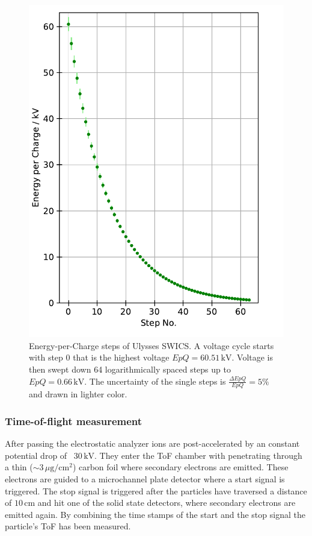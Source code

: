 \begin{figure}[h]
		\centering
		\includegraphics[scale = 0.7]{Figures/epq_err.pdf}
		\caption{Energy-per-Charge steps of Ulysses SWICS. A voltage cycle starts with step 0 that is the highest voltage $EpQ = 60.51\, \mathrm{kV}$. Voltage is then swept down 64 logarithmically spaced steps up to $EpQ = 0.66\, \mathrm{kV}$. The uncertainty of the single steps is $\frac{\Delta EpQ}{EpQ} = 5\%$ and drawn in lighter color.
		} \label{fig:epq}
\end{figure}
  
\subsubsection{Time-of-flight measurement}
After passing the electrostatic analyzer ions are post-accelerated by an constant potential drop of ~$30\,\mathrm{kV}$. They enter the ToF chamber with penetrating through a thin ($\sim 3\,\mu \mathrm{g / cm^2}$) carbon foil where secondary electrons are emitted. These electrons are guided to a microchannel plate detector where a start signal is triggered. The stop signal is triggered after the particles have traversed a distance of $10\,\mathrm{cm}$ and hit one of the solid state detectors, where secondary electrons are emitted again. By combining the time stamps of the start and the stop signal the particle's ToF has been measured.
